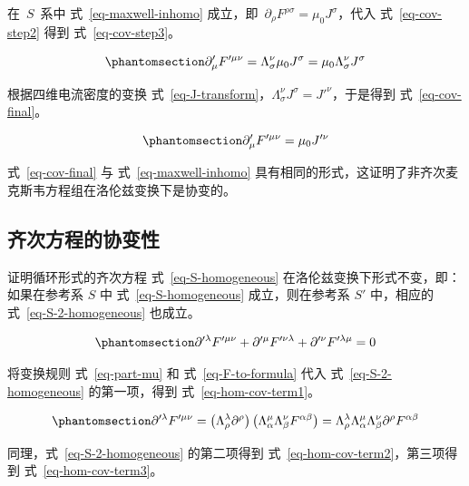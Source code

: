\documentclass[
  chinese,
  a4paper,
  UTF8,
  12pt,
  oneside,
  openany]{ctexbook}
\theoremstyle{plain}
\theoremstyle{plain}
\theoremstyle{plain}
\theoremstyle{definition}
\theoremstyle{plain}
\theoremstyle{plain}
\theoremstyle{remark}
\begin{document}
在~\(S\)~系中 式~\ref{eq-maxwell-inhomo}
成立，即~\(\partial_{\rho}F^{\rho\sigma} = \mu_{0}J^{\sigma}\)，代入
式~\ref{eq-cov-step2} 得到 式~\ref{eq-cov-step3}。

\begin{equation}\protect\phantomsection\label{eq-cov-step3}{
\partial'_{\mu}F'^{\mu\nu} = \Lambda_{\sigma}^{\nu}\mu_{0}J^{\sigma} = \mu_{0}\Lambda_{\sigma}^{\nu}J^{\sigma}
}\end{equation}

根据四维电流密度的变换
式~\ref{eq-J-transform}，\(\Lambda_{\sigma}^{\nu}J^{\sigma} = J'^{\nu}\)，于是得到
式~\ref{eq-cov-final}。

\begin{equation}\protect\phantomsection\label{eq-cov-final}{
\partial'_{\mu}F'^{\mu\nu} = \mu_{0}J'^{\nu}
}\end{equation}

式~\ref{eq-cov-final} 与 式~\ref{eq-maxwell-inhomo}
具有相同的形式，这证明了非齐次麦克斯韦方程组在洛伦兹变换下是协变的。

\subsection{齐次方程的协变性}\label{ux9f50ux6b21ux65b9ux7a0bux7684ux534fux53d8ux6027}

证明循环形式的齐次方程 式~\ref{eq-S-homogeneous}
在洛伦兹变换下形式不变，即：如果在参考系 \(S\) 中
式~\ref{eq-S-homogeneous} 成立，则在参考系 \(S'\) 中，相应的
式~\ref{eq-S-2-homogeneous} 也成立。

\begin{equation}\protect\phantomsection\label{eq-S-2-homogeneous}{
\partial'^{\lambda}F'^{\mu\nu} + \partial'^{\mu}F'^{\nu\lambda} + \partial'^{\nu}F'^{\lambda\mu} = 0
}\end{equation}

将变换规则 式~\ref{eq-part-mu} 和 式~\ref{eq-F-to-formula} 代入
式~\ref{eq-S-2-homogeneous} 的第一项，得到 式~\ref{eq-hom-cov-term1}。

\begin{equation}\protect\phantomsection\label{eq-hom-cov-term1}{
\partial'^{\lambda}F'^{\mu\nu} = \left(\Lambda_{\rho}^{\lambda}\partial^{\rho} \right)\left(\Lambda_{\alpha}^{\mu}\Lambda_{\beta}^{\nu}F^{\alpha\beta} \right)
= \Lambda_{\rho}^{\lambda} \Lambda_{\alpha}^{\mu}\Lambda_{\beta}^{\nu}\partial^{\rho}F^{\alpha\beta}
}\end{equation}

同理，式~\ref{eq-S-2-homogeneous} 的第二项得到
式~\ref{eq-hom-cov-term2}，第三项得到 式~\ref{eq-hom-cov-term3}。
\end{document}
